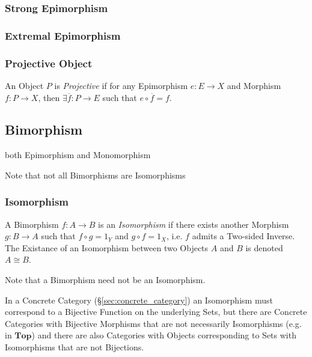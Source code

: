 \subsubsection{Strong Epimorphism}\label{sec:strong_epimorphism}

\subsubsection{Extremal Epimorphism}\label{sec:extremal_epimorphism}

\subsubsection{Projective Object}\label{sec:projective_object}

An Object $P$ is \emph{Projective} if for any Epimorphism $e : E
\rightarrow X$ and Morphism $f : P \rightarrow X$, then $\exists
\overline{f} : P \rightarrow E$ such that $e \circ \overline{f} = f$.



\subsection{Bimorphism}\label{sec:bimorphism}

both Epimorphism and Monomorphism

\HandRight\; Note that not all Bimorphisms are Isomorphisms



\subsubsection{Isomorphism}\label{sec:isomorphism}

A Bimorphism $f : A \rightarrow B$ is an \emph{Isomorphism} if there
exists another Morphism $g : B \rightarrow A$ such that $f \circ g =
1_Y$ and $g \circ f = 1_X$, i.e. $f$ admits a Two-sided Inverse. The
Existance of an Isomorphism between two Objects $A$ and $B$ is denoted
$A \cong B$.

\HandRight\; Note that a Bimorphism need not be an Isomorphism.

In a Concrete Category (\S\ref{sec:concrete_category}) an Isomorphism
must correspond to a Bijective Function on the underlying Sets, but
there are Concrete Categories with Bijective Morphisms that are not
necessarily Isomorphisms (e.g. in $\mathbf{Top}$) and there are also
Categories with Objects corresponding to Sets with Isomorphisms that
are not Bijections.

